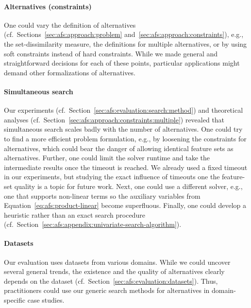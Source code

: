 \documentclass{article}
\theoremstyle{definition}
\begin{document}
\paragraph{Alternatives (constraints)}

One could vary the definition of alternatives (cf.~Sections~\ref{sec:afs:approach:problem} and~\ref{sec:afs:approach:constraints}), e.g., the set-dissimilarity measure, the definitions for multiple alternatives, or by using soft constraints instead of hard constraints.
While we made general and straightforward decisions for each of these points, particular applications might demand other formalizations of alternatives.

\paragraph{Simultaneous search}

Our experiments (cf.~Section~\ref{sec:afs:evaluation:search:method}) and theoretical analyses (cf.~Section~\ref{sec:afs:approach:constraints:multiple}) revealed that simultaneous search scales badly with the number of alternatives.
One could try to find a more efficient problem formulation, e.g., by loosening the constraints for alternatives, which could bear the danger of allowing identical feature sets as alternatives.
Further, one could limit the solver runtime and take the intermediate results once the timeout is reached.
We already used a fixed timeout in our experiments, but studying the exact influence of timeouts one the feature-set quality is a topic for future work.
Next, one could use a different solver, e.g., one that supports non-linear terms so the auxiliary variables from Equation~\ref{eq:afs:product-linear} become superfluous.
Finally, one could develop a heuristic rather than an exact search procedure (cf.~Section~\ref{sec:afs:appendix:univariate-search-algorithm}).

\paragraph{Datasets}

Our evaluation uses datasets from various domains.
While we could uncover several general trends, the existence and the quality of alternatives clearly depends on the dataset (cf.~Section~\ref{sec:afs:evaluation:datasets}).
Thus, practitioners could use our generic search methods for alternatives in domain-specific case studies.

\appendix
\end{document}
